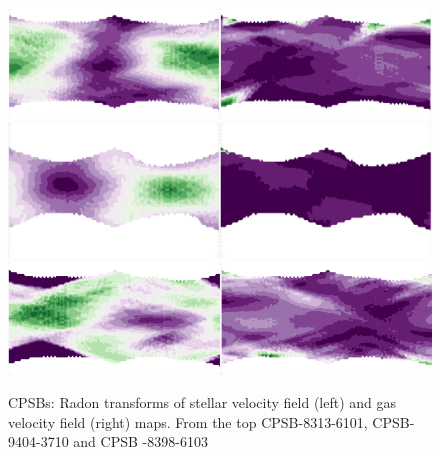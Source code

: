 

\begin{figure}
    \centering
    \includegraphics[width=\columnwidth]{images/RadonPlots/RT-snips/CPSB-8313-6101-RT-snip.png}
    \includegraphics[width=\columnwidth]{images/RadonPlots/RT-snips/CPSB-9494-3701-RT-snip.png}
    \includegraphics[width=\columnwidth]{images/RadonPlots/RT-snips/CPSB-8398-6102-RT-snip.png}
    \caption{CPSBs: Radon transforms of stellar velocity field (left) and gas velocity field (right) maps. From the top CPSB-8313-6101, CPSB-9404-3710 and CPSB -8398-6103}
    \label{fig:CPSB-RTs}
\end{figure}

